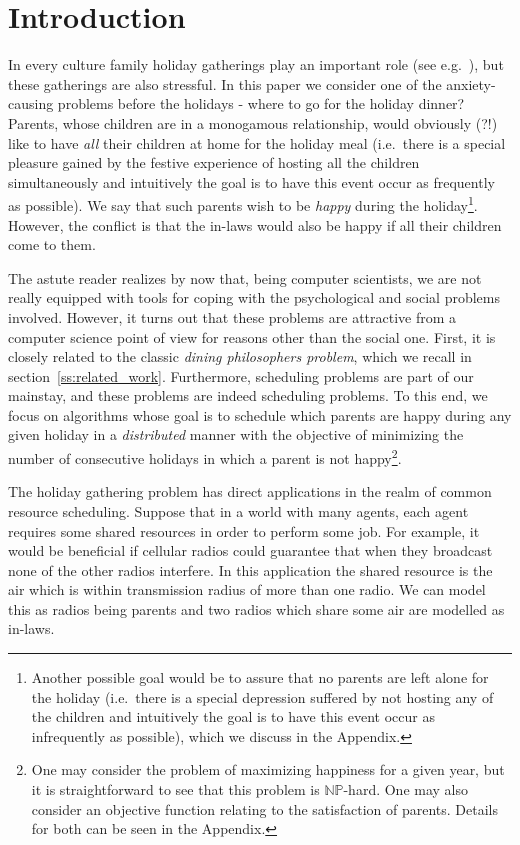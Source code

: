 \documentclass[11pt]{article}
\begin{document}
\setcounter{page}{0}
\newpage

\section{Introduction}\label{s:int}


In every culture family holiday gatherings play an
important role (see e.g.~\cite{nrg:09,tnn:10}), but these gatherings are also stressful.
In this paper we consider one of the anxiety-causing problems before
the holidays - where to go for the holiday dinner? Parents, whose
children are in a monogamous relationship, would obviously (?!) like
to have {\em all} their children at home for the holiday meal
(i.e.\ there is a special pleasure gained by the festive experience of
hosting all the children simultaneously and intuitively the goal is to
have this event occur as frequently as possible). We say that such
parents wish to be \emph{happy} during the holiday\footnote{Another possible goal would be to assure that no parents
are left alone for the holiday (i.e.\ there is a special depression
suffered by not hosting any of the children and intuitively the goal
is to have this event occur as infrequently as possible), which we discuss in the Appendix.}. However, the
conflict is that the in-laws would also be happy if all their children
come to them.


The astute reader realizes by now that, being computer
scientists, we are not really equipped with tools for coping with the
psychological and social problems involved. However, it turns out that
these problems are attractive from a computer science point of view
for reasons other than the social one. First, it is closely related to
the classic {\em dining philosophers problem}, which we recall in
section~\ref{ss:related_work}. Furthermore, scheduling problems are
part of our mainstay, and these problems are indeed scheduling
problems. To this end, we focus on algorithms whose goal is to
schedule which parents are happy during any given holiday in a {\em distributed} manner with the
objective of minimizing the number of consecutive holidays in which a
parent is not happy\footnote{One may consider the problem of
maximizing happiness for a given year, but it is straightforward to
see that this problem is $\mathbb{NP}$-hard. One may also consider an
objective function relating to the satisfaction of parents. Details
for both can be seen in the Appendix.}.

The holiday gathering problem has direct applications in the realm of common resource scheduling. Suppose that in a world with many agents, each agent requires some shared resources in order to perform some job. For example, it would be beneficial if cellular radios could guarantee that when they broadcast none of the other radios interfere. In this application the shared resource is the air which is within transmission radius of more than one radio. We can model this as radios being parents and two radios which share some air are modelled as in-laws.
\end{document}
